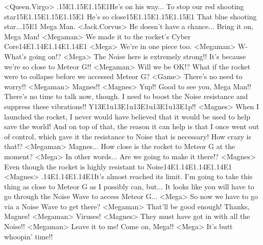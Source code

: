 <Queen.Virgo> .{15}{E1}.{15}{E1}.{15}{E1}He's on his way... To stop our red shooting star{15}{E1}.{15}{E1}.{15}{E1}.{15}{E1} 
He's so close{15}{E1}.{15}{E1}.{15}{E1}.{15}{E1} That blue shooting star...{15}{E1} Mega Man. 
<Jack.Corvus> He doesn't have a chance... 
Bring it on, Mega Man! 
<Megaman> We made it to the rocket's Cyber Core{14}{E1}.{14}{E1}.{14}{E1}.{14}{E1} 
<Mega> We're in one piece too. 
<Megaman> W-What's going on!? 
<Mega> The Noise here is extremely strong!! It's because we're so close to Meteor G!! 
<Megaman> Will we be OK!? 
What if the rocket were to collapse before we accessed Meteor G? 
<Game> There's no need to worry!! 
<Megaman> Magnes!! 
<Magnes> Yup!! Good to see you, Mega Man!! 
There's no time to talk now, though. I need to boost the 
Noise resistance and suppress these vibrations!! 
Y{13}{E1}u{13}{E1}u{13}{E1}u{13}{E1}u{13}{E1}p!! 
<Magnes> When I launched the rocket, I never would have believed 
that it would be used to help save the world! 
And on top of that, the reason it can help is that I once went out of control, 
which gave it the resistance to Noise that is necessary! 
How crazy is that!? 
<Megaman> Magnes... How close is the rocket to Meteor G at the moment? 
<Mega> In other words... Are we going to make it there!? 
<Magnes> Even though the rocket is highly resistant to Noise{14}{E1}.{14}{E1}.{14}{E1}.{14}{E1} 
<Magnes> .{14}{E1}.{14}{E1}.{14}{E1}It's almost reached its limit. 
I'm going to take this thing as close to Meteor G as I possibly can, but... 
It looks like you will have to go through the Noise Wave to access Meteor G... 
<Mega> So now we have to go via a Noise Wave to get there? 
<Megaman> That'll be good enough! Thanks, Magnes! 
<Megaman> Viruses! 
<Magnes> They must have got in with all the Noise!! 
<Megaman> Leave it to me! 
Come on, Mega!! 
<Mega> It's butt whoopin' time!! 
